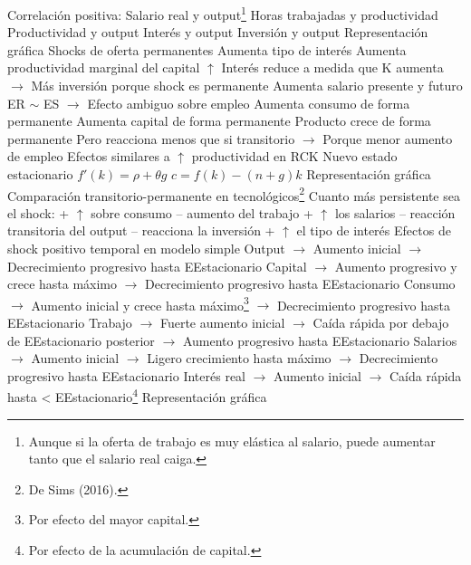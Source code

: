 \documentclass{nuevotema}
\begin{document}
\begin{esquemal}
				\4[$\Rightarrow$] Correlación positiva:
				\4[] Salario real y output\footnote{Aunque si la oferta de trabajo es muy elástica al salario, puede aumentar tanto que el salario real caiga.}
				\4[] Horas trabajadas y productividad
				\4[] Productividad y output
				\4[] Interés y output
				\4[] Inversión y output
				\4 Representación gráfica
				\4[] 
			\3 Shocks de oferta permanentes
				\4 Aumenta tipo de interés
				\4[] Aumenta productividad marginal del capital
				\4[] $\uparrow$ Interés reduce a medida que K aumenta
				\4[] $\to$ Más inversión porque shock es permanente
				\4 Aumenta salario presente y futuro
				\4[] ER $\sim$ ES $\to$ Efecto ambiguo sobre empleo
				\4 Aumenta consumo de forma permanente
				\4 Aumenta capital de forma permanente
				\4 Producto crece de forma permanente
				\4[] Pero reacciona menos que si transitorio
				\4[] $\to$ Porque menor aumento de empleo
				\4 Efectos similares a $\uparrow$ productividad en RCK
				\4[] Nuevo estado estacionario
				\4[] $f'(k) = \rho + \theta g$
				\4[] $c=f(k) -(n+g)k$
				\4 Representación gráfica
				\4[] 
			\3 Comparación transitorio-permanente en tecnológicos\footnote{De Sims (2016).}
				\4 Cuanto más persistente sea el shock:
				\4[Consumo] + $\uparrow$ sobre consumo
				\4[Tratajo] -- aumento del trabajo
				\4[Salarios] + $\uparrow$ los salarios
				\4[Output] -- reacción transitoria del output
				\4[Inversión] -- reacciona la inversión
				 + $\uparrow$ el tipo de interés
				\4 Efectos de shock positivo temporal en modelo simple
				\4[] Output
				\4[] $\to$ Aumento inicial
				\4[] $\to$ Decrecimiento progresivo hasta EEstacionario
				\4[] Capital
				\4[] $\to$ Aumento progresivo y crece hasta máximo
				\4[] $\to$ Decrecimiento progresivo hasta EEstacionario
				\4[] Consumo
				\4[] $\to$ Aumento inicial y crece hasta máximo\footnote{Por efecto del mayor capital.}
				\4[] $\to$ Decrecimiento progresivo hasta EEstacionario
				\4[] Trabajo
				\4[] $\to$ Fuerte aumento inicial
				\4[] $\to$ Caída rápida por debajo de EEstacionario posterior
				\4[] $\to$ Aumento progresivo hasta EEstacionario
				\4[] Salarios
				\4[] $\to$ Aumento inicial
				\4[] $\to$ Ligero crecimiento hasta máximo
				\4[] $\to$ Decrecimiento progresivo hasta EEstacionario
				\4[] Interés real
				\4[] $\to$ Aumento inicial
				\4[] $\to$ Caída rápida hasta < EEstacionario\footnote{Por efecto de la acumulación de capital.}
				\4[] Representación gráfica
				\4[] 

\end{esquemal}
\end{document}
